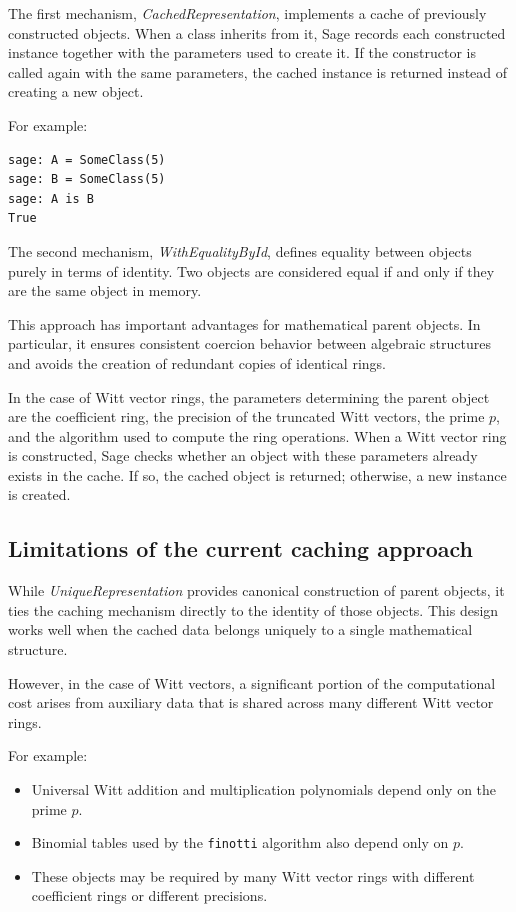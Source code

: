 \documentclass[oneside, a4paper, onecolumn, 11pt]{article}
\theoremstyle{definition}
\begin{document}
The first mechanism, \emph{CachedRepresentation}, implements a cache of previously constructed objects. When a class inherits from it, Sage records each constructed instance together with the parameters used to create it. If the constructor is called again with the same parameters, the cached instance is returned instead of creating a new object.

For example:

\begin{verbatim}
sage: A = SomeClass(5)
sage: B = SomeClass(5)
sage: A is B
True
\end{verbatim}

The second mechanism, \emph{WithEqualityById}, defines equality between objects purely in terms of identity. Two objects are considered equal if and only if they are the same object in memory.

This approach has important advantages for mathematical parent objects. In particular, it ensures consistent coercion behavior between algebraic structures and avoids the creation of redundant copies of identical rings.

In the case of Witt vector rings, the parameters determining the parent object are the coefficient ring, the precision of the truncated Witt vectors, the prime $p$, and the algorithm used to compute the ring operations. When a Witt vector ring is constructed, Sage checks whether an object with these parameters already exists in the cache. If so, the cached object is returned; otherwise, a new instance is created.


\subsection{Limitations of the current caching approach}

While \emph{UniqueRepresentation} provides canonical construction of parent objects, it ties the caching mechanism directly to the identity of those objects. This design works well when the cached data belongs uniquely to a single mathematical structure.

However, in the case of Witt vectors, a significant portion of the computational cost arises from auxiliary data that is shared across many different Witt vector rings.

For example:

\begin{itemize}
\item Universal Witt addition and multiplication polynomials depend only on the prime $p$.
\item Binomial tables used by the \texttt{finotti} algorithm also depend only on $p$.
\item These objects may be required by many Witt vector rings with different coefficient rings or different precisions.
\end{itemize}
\end{document}
